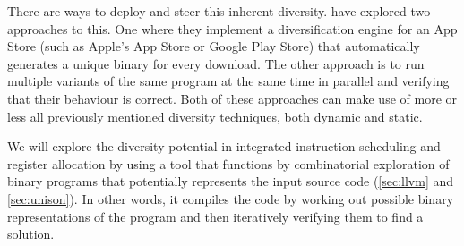 There are ways to deploy and steer this inherent diversity. \textcite{compiler-generated-sw-div}
have explored two approaches to this. One where they implement a diversification engine for
an App Store (such as Apple's App Store or Google Play Store) that automatically generates
a unique binary for every download. The other approach is to run multiple variants of the
same program at the same time in parallel and verifying that their behaviour is correct.
Both of these approaches can make use of more or less all previously mentioned diversity
techniques, both dynamic and static.

We will explore the diversity potential in integrated instruction scheduling and register
allocation by using a tool that functions by combinatorial exploration of binary programs
that potentially represents the input source code (\ref{sec:llvm} and \ref{sec:unison}).
In other words, it compiles the code by working out possible binary representations of the
program and then iteratively verifying them to find a solution.

%
%
%
